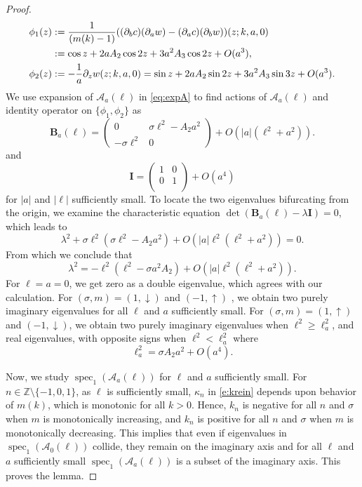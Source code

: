 \documentclass[12pt]{amsart}    %
\renewcommand{\geq}{\geqslant}
\renewcommand{\k}{\kappa}
\newcommand{\Z}{\mathbb{Z}}
\newcommand{\oneu}{(1,\uparrow)}
\newcommand{\oned}{(1,\downarrow)}
\newcommand{\minu}{(-1,\uparrow)}
\newcommand{\mind}{(-1,\downarrow)}
\numberwithin{equation}{section}
\begin{document}
\begin{proof}
\begin{align}
\phi_1(z) &:=\frac{1}{(m(k)-1)}((\partial_b c)(\partial_a w)-(\partial_a c)(\partial_b w))(z;k,a,0) \notag\\
&:=\cos z + 2a A_2\cos 2z+ 3a^2 A_3 \cos 2z +O(a^3),\label{def:p2}\\
\phi_2(z) &:=-\frac{1}{a}\partial_z w(z;k,a,0)= \sin z+2 a A_2\sin2z + 3a^2 A_3 \sin 3z +O(a^3).\label{def:p1}
\end{align}
We use expansion of $\mathcal A_a(\ell)$ in \eqref{eq:expA} to find actions of $\mathcal{A}_a(\ell)$ and identity operator on $\{\phi_1,\phi_2\}$ as
\[
\mathbf{B}_a(\ell)=\begin{pmatrix}0&\sigma \ell^2 - A_2 a^2
\\-\sigma \ell^2&0
\end{pmatrix}+O(|a|(\ell^2+a^2)).
\]
and
\begin{equation}\label{E:Ia}
\mathbf{I}=\left(\begin{matrix} 1 &  0 \\ 0 &  1 \\\end{matrix}\right)+O(a^4)
\end{equation}
for $|a|$ and $|\ell|$ sufficiently small. To locate the two eigenvalues bifurcating from the origin, we examine the characteristic equation $\det(\mathbf{B}_a(\ell)-\lambda \mathbf{I})=0$, which leads to
\[
 \lambda^2 + \sigma\ell^2(\sigma\ell^2-A_2a^2) +  O(|a|\ell^2(\ell^2+a^2)) = 0.
\]
From which we conclude that 
\[
\lambda^2 = -\ell^2(\ell^2-\sigma a^2A_2) + O(|a|\ell^2(\ell^2+a^2)).
\]
For $\ell=a=0$, we get zero as a double eigenvalue, which agrees with our calculation. For $(\sigma,m)=\oned$ and $\minu$ , we obtain two purely imaginary eigenvalues for all $\ell$ and $a$ sufficiently small. For $(\sigma,m)=\oneu$ and $\mind$, we obtain two purely imaginary eigenvalues when
$\ell^2\geq \ell_a^2$, and real eigenvalues, with opposite signs when $\ell^2<\ell_a^2$ where
\[
\ell_a^2 = \sigma A_2a^2+O(a^4).
\]

Now, we study $\operatorname{spec}_1(\mathcal A_a(\ell))$ for $\ell$ and $a$ sufficiently small. For $n \in \Z\setminus \{-1,0,1\}$, as $\ell$ is sufficiently small, $\k_n$ in \eqref{e:krein} depends upon behavior of $m(k)$, which is monotonic for all $k>0$.
Hence, $k_n$ is negative for all $n$ and $\sigma$ when $m$ is monotonically increasing, and $k_n$ is positive for all $n$ and $\sigma$ when $m$ is monotonically decreasing. This implies that even if eigenvalues in $\operatorname{spec}_1(\mathcal A_0(\ell))$ collide, they remain on the imaginary axis and for all $\ell$ and $a$ sufficiently small $\operatorname{spec}_1(\mathcal A_a(\ell))$ is a subset of the imaginary axis. This proves the lemma.
\end{proof}
\end{document}

